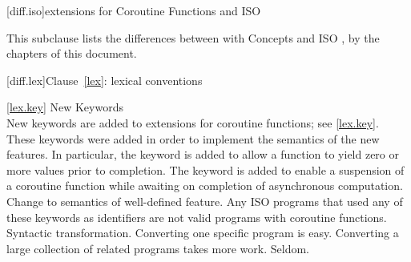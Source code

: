 
[diff.iso]{\Cpp extensions for Coroutine Functions and ISO }

\pnum
This subclause lists the differences between \Cpp with Concepts
and ISO \Cpp, by the chapters of this document.

[diff.lex]{Clause~\ref{lex}: lexical conventions}

\ref{lex.key}
\change New Keywords\\
New keywords are added to \Cpp extensions for coroutine functions;
see \ref{lex.key}.
\rationale
These keywords were added in order to implement the semantics of the
new features. In particular, the  keyword is added
to allow a function to yield zero or more values prior to completion. The  keyword is
added to enable a suspension of a coroutine function while
awaiting on completion of asynchronous computation.
\effect
Change to semantics of well-defined feature.
Any ISO \Cpp programs that used any of these keywords as identifiers
are not valid \Cpp programs with coroutine functions.
\difficulty
Syntactic transformation.
Converting one specific program is easy.
Converting a large collection
of related programs takes more work.
\howwide
Seldom.

